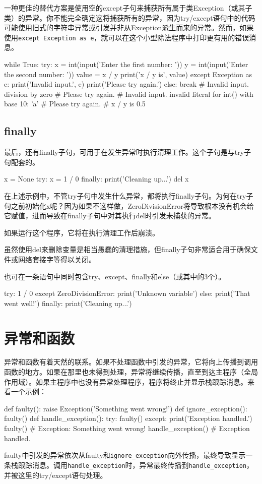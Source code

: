 一种更佳的替代方案是使用空的except子句来捕获所有属于类Exception（或其子类）的异常。你不能完全确定这将捕获所有的异常，因为try/except语句中的代码可能使用旧式的字符串异常或引发并非从Exception派生而来的异常。然而，如果使用\verb|except Exception as e|，就可以在这个小型除法程序中打印更有用的错误消息。
\begin{pyc}
while True:
    try:
        x = int(input('Enter the first number: '))
        y = int(input('Enter the second number: '))
        value = x / y
        print('x / y is', value)
    except Exception as e:
        print('Invalid input.', e)
        print('Please try again.')
    else:
        break
# Invalid input. division by zero
# Please try again.
# Invalid input. invalid literal for int() with base 10: 'a'
# Please try again.
# x / y is 0.5
\end{pyc}
\subsection{finally}
最后，还有finally子句，可用于在发生异常时执行清理工作。这个子句是与try子句配套的。
\begin{pyc}
x = None
try:
    x = 1 / 0 
finally:
    print('Cleaning up...')
    del x
\end{pyc}
在上述示例中，不管try子句中发生什么异常，都将执行finally子句。为何在try子句之前初始化x呢？因为如果不这样做，ZeroDivisionError将导致根本没有机会给它赋值，进而导致在finally子句中对其执行del时引发未捕获的异常。

如果运行这个程序，它将在执行清理工作后崩溃。

虽然使用del来删除变量是相当愚蠢的清理措施，但finally子句非常适合用于确保文件或网络套接字等得以关闭。

也可在一条语句中同时包含try、except、finally和else（或其中的3个）。
\begin{pyc}
try:
    1 / 0
except ZeroDivisionError:
    print('Unknown variable')
else:
    print('That went well!')
finally:
    print('Cleaning up...')
\end{pyc}

\section{异常和函数}
异常和函数有着天然的联系。如果不处理函数中引发的异常，它将向上传播到调用函数的地方。如果在那里也未得到处理，异常将继续传播，直至到达主程序（全局作用域）。如果主程序中也没有异常处理程序，程序将终止并显示栈跟踪消息。来看一个示例：
\begin{pyc}
def faulty():
    raise Exception('Something went wrong!')
def ignore_exception():
    faulty()
def handle_exception():
    try:
        faulty()
    except:
        print('Exception handled.')
faulty()  # Exception: Something went wrong!
handle_exception()  # Exception handled.
\end{pyc}
faulty中引发的异常依次从faulty和\verb|ignore_exception|向外传播，最终导致显示一条栈跟踪消息。调用\verb|handle_exception|时，异常最终传播到\verb|handle_exception|，并被这里的try/except语句处理。
